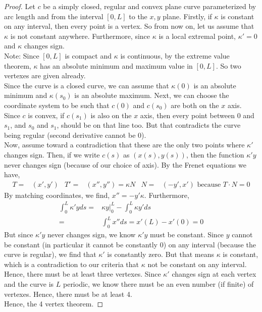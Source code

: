 \documentclass[12pt]{amsart}
\begin{document}
\begin{proof}
	Let $c$ be a simply closed, regular and convex plane curve parameterized by arc length and from the interval $[0,L]$ to the $x,y$ plane. Firstly, if $\kappa$ is constant on any interval, then every point is a vertex. So from now on, let us assume that $\kappa$ is not constant anywhere. Furthermore, since $\kappa$ is a local extremal point, $\kappa'=0$ and $\kappa$ changes sign.
	\\Note: Since $[0,L]$ is compact and $\kappa$ is continuous, by the extreme value theorem, $\kappa$ has an absolute minimum and maximum value in $[0,L]$. So two vertexes are given already.
	\\Since the curve is a closed curve, we can assume that $\kappa(0)$ is an absolute minimum and $\kappa(s_0)$ is an absolute maximum. Next, we can choose the coordinate system to be such that $c(0)$ and $c(s_0)$ are both on the $x$ axis. Since $c$ is convex, if $c(s_1)$ is also on the $x$ axis, then every point between $0$ and $s_1$, and $s_0$ and $s_1$, should be on that line too. But that contradicts the curve being regular (second derivative cannot be 0).
	\\Now, assume toward a contradiction that these are the only two points where $\kappa'$ changes sign. Then, if we write $c(s)$ as $(x(s),y(s))$, then the function $\kappa'y$ never changes sign (because of our choice of axis). By the Frenet equations we have,
	\begin{align*}
		T=&(x',y') & T'=&(x'',y'')=\kappa N & N=&(-y',x')\text{ because $T\cdot N=0$}
	\end{align*}
	By matching coordinates, we find, $x''=-y'\kappa$. Furthermore,
	\begin{align*}
		\int_0^L\kappa'yds=&\kappa y|_0^L-\int_0^L\kappa y'ds
		\\=&\int_0^Lx''ds=x'(L)-x'(0)=0
	\end{align*}
	But since $\kappa'y$ never changes sign, we know $\kappa'y$ must be constant. Since $y$ cannot be constant (in particular it cannot be constantly 0) on any interval (because the curve is regular), we find that $\kappa'$ is constantly zero. But that means $\kappa$ is constant, which is a contradiction to our criteria that $\kappa$ not be constant on any interval.
	\\Hence, there must be at least three vertexes. Since $\kappa'$ changes sign at each vertex and the curve is $L$ periodic, we know there must be an even number (if finite) of vertexes. Hence, there must be at least 4.
	\\Hence, the 4 vertex theorem.
\end{proof}
\end{document}
